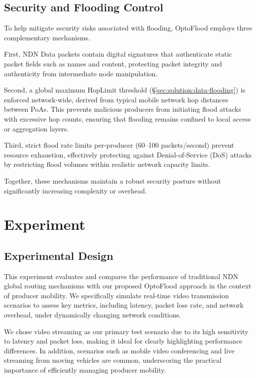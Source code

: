 \documentclass[conference]{IEEEtran}
\begin{document}
\subsection{Security and Flooding Control}

To help mitigate security risks associated with flooding, OptoFlood employs three complementary mechanisms.

First, NDN Data packets contain digital signatures that authenticate static packet fields such as names and content, protecting packet integrity and authenticity from intermediate node manipulation. %

Second, a global maximum HopLimit threshold (\S\ref{sec:solution:data-flooding}) is enforced network-wide, derived from typical mobile network hop distances between PoAs. This prevents malicious producers from initiating flood attacks with excessive hop counts, ensuring that flooding remains confined to local access or aggregation layers.

Third, strict flood rate limits per-producer (60–100 packets/second) prevent resource exhaustion, effectively protecting against Denial-of-Service (DoS) attacks by restricting flood volumes within realistic network capacity limits.

Together, these mechanisms maintain a robust security posture without significantly increasing complexity or overhead.

\section{Experiment}
\subsection{Experimental Design}
This experiment evaluates and compares the performance of traditional NDN global routing mechanisms with our proposed OptoFlood approach in the context of producer mobility. We specifically simulate real-time video transmission scenarios to assess key metrics, including latency, packet loss rate, and network overhead, under dynamically changing network conditions.

We chose video streaming as our primary test scenario due to its high sensitivity to latency and packet loss, making it ideal for clearly highlighting performance differences. In addition, scenarios such as mobile video conferencing and live streaming from moving vehicles are common, underscoring the practical importance of efficiently managing producer mobility.
\end{document}
